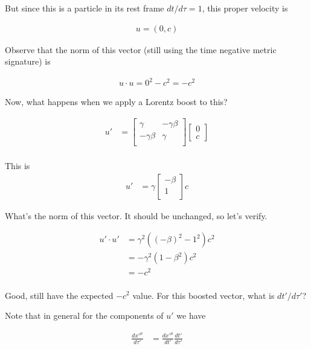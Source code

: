 But since this is a particle in its rest frame $dt/d\tau = 1$, this proper velocity is

\begin{align*}
u = \left(0, c \right) 
\end{align*}

Observe that the norm of this vector (still using the time negative metric signature) is

\begin{align*}
u \cdot u = 0^2 - c^2 = -c^2
\end{align*}

Now, what happens when we apply a Lorentz boost to this?

\begin{align*}
u' &= 
\begin{bmatrix}
\gamma & - \gamma \beta \\
- \gamma \beta & \gamma \\
\end{bmatrix}
\begin{bmatrix}
0 \\
c
\end{bmatrix} \\
\end{align*}

This is
\begin{align}\label{eqn:uPrime}
u' &= 
\gamma
\begin{bmatrix}
- \beta \\
1 \\
\end{bmatrix}
c
\end{align}

What's the norm of this vector.  It should be unchanged, so let's verify.

\begin{align*}
u' \cdot u' 
&= \gamma^2 \left( (- \beta)^2 - 1^2 \right) c^2 \\
&= - \gamma^2 \left( 1 - \beta^2 \right) c^2 \\
&= - c^2 \\
\end{align*}

Good, still have the expected $-c^2$ value.  For this boosted vector, what is $dt'/d\tau'$?

Note that in general for the components of $u'$ we have

\begin{align*}
\frac{{dx'}^\mu}{d\tau'}
&=
\frac{{dx'}^\mu}{dt'} \frac{{dt'}}{d\tau'}
\end{align*}

